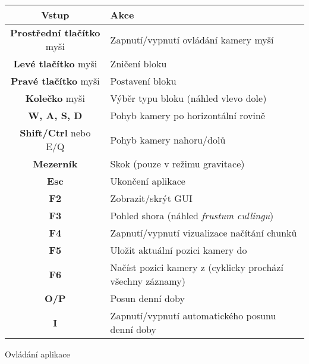 \begin{tableFloat}[H]
	\begin{tabular}{c l}
		\textbf{Vstup} & \textbf{Akce} \\ \hline
		\textbf{Prostřední tlačítko} myši & Zapnutí/vypnutí ovládání kamery myší \\
		\textbf{Levé tlačítko} myši & Zničení bloku \\
		\textbf{Pravé tlačítko} myši & Postavení bloku \\
		\textbf{Kolečko} myši & Výběr typu bloku (náhled vlevo dole) \\
		\textbf{W, A, S, D} & Pohyb kamery po horizontální rovině \\
		\textbf{Shift/Ctrl} nebo E/Q & Pohyb kamery nahoru/dolů \\
		\textbf{Mezerník} & Skok (pouze v režimu gravitace) \\
		\textbf{Esc} & Ukončení aplikace \\
		\textbf{F2} & Zobrazit/skrýt GUI \\
		\textbf{F3} & Pohled shora (náhled \textit{frustum cullingu}) \\
		\textbf{F4} & Zapnutí/vypnutí vizualizace načítání chunků \\
		\textbf{F5} & Uložit aktuální pozici kamery do \inlineDCode{positions.txt} \\
		\textbf{F6} & Načíst pozici kamery z \inlineDCode{positions.txt} (cyklicky prochází všechny záznamy) \\
		\textbf{O/P} & Posun denní doby \\
		\textbf{I} & Zapnutí/vypnutí automatického posunu denní doby \\
	\end{tabular}
	\caption{Ovládání aplikace}
\end{tableFloat}

\vfill
{}

